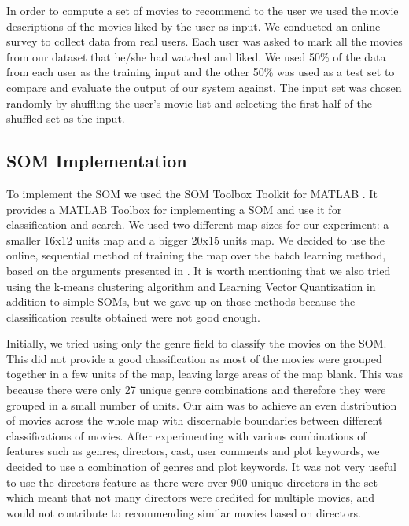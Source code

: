 \documentclass[conference]{IEEEtran}
\begin{document}
In order to compute a set of movies to recommend to the user we used the movie descriptions of the movies liked by the user as input. We conducted an online survey to collect data from real users. Each user was asked to mark all the movies from our dataset that he/she had watched and liked. We used 50\% of the data from each user as the training input and the other 50\% was used as a test set to compare and evaluate the output of our system against. The input set was chosen randomly by shuffling the user’s movie list and selecting the first half of the shuffled set as the input.

\subsection{SOM Implementation}

To implement the SOM we used the SOM Toolbox Toolkit for MATLAB \cite{vesanto2000som}. It provides a MATLAB Toolbox for implementing a SOM and use it for classification and search. We used two different map sizes for our experiment: a smaller 16x12 units map and a bigger 20x15 units map. We decided to use the online, sequential method of training the map over the batch learning method, based on the arguments presented in \cite{fort2002advantages}. It is worth mentioning that we also tried using the k-means clustering algorithm \cite{hartigan1979algorithm} and Learning Vector Quantization \cite{kohonen1997learning} in addition to simple SOMs, but we gave up on those methods because the classification results obtained were not good enough. 

Initially, we tried using only the genre field to classify the movies on the SOM. This did not provide a good classification as most of the movies were grouped together in a few units of the map, leaving large areas of the map blank. This was because there were only 27 unique genre combinations and therefore they were grouped in a small number of units. Our aim was to achieve an even distribution of movies across the whole map with discernable boundaries between different classifications of movies. After experimenting with various combinations of features such as genres, directors, cast, user comments and plot keywords, we decided to use a combination of genres and plot keywords. It was not very useful to use the directors feature as there were over 900 unique directors in the set which meant that not many directors were credited for multiple movies, and would not contribute to recommending similar movies based on directors. 
\end{document}

